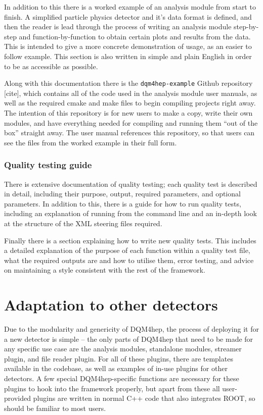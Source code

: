 In addition to this there is a worked example of an analysis module from start to finish. A simplified particle physics detector and it's data format is defined, and then the reader is lead through the process of writing an analysis module step-by-step and function-by-function to obtain certain plots and results from the data. This is intended to give a more concrete demonstration of usage, as an easier to follow example. This section is also written in simple and plain English in order to be as accessible as possible.

Along with this documentation there is the \texttt{dqm4hep-example} Github repository [cite], which contains all of the code used in the analysis module user manuals, as well as the required cmake and make files to begin compiling projects right away. The intention of this repository is for new users to make a copy, write their own modules, and have everything needed for compiling and running them ``out of the box'' straight away. The user manual references this repository, so that users can see the files from the worked example in their full form.

\subsubsection*{Quality testing guide}
There is extensive documentation of quality testing; each quality test is described in detail, including their purpose, output, required parameters, and optional parameters. In addition to this, there is a guide for how to run quality tests, including an explanation of running from the command line and an in-depth look at the structure of the \acrshort{XML} steering files required.

Finally there is a section explaining how to write new quality tests. This includes a detailed explanation of the purpose of each function within a quality test file, what the required outputs are and how to utilise them, error testing, and advice on maintaining a style consistent with the rest of the framework.

\section{Adaptation to other detectors}
Due to the modularity and genericity of \acrshort{DQM4hep}, the process of deploying it for a new detector is simple -- the only parts of \acrshort{DQM4hep} that need to be made for any specific use case are the analysis modules, standalone modules, streamer plugin, and file reader plugin. For all of these plugins, there are templates available in the codebase, as well as examples of in-use plugins for other detectors. A few special \acrshort{DQM4hep}-specific functions are necessary for these plugins to hook into the framework properly, but apart from these all user-provided plugins are written in normal C++ code that also integrates ROOT, so should be familiar to most users.


